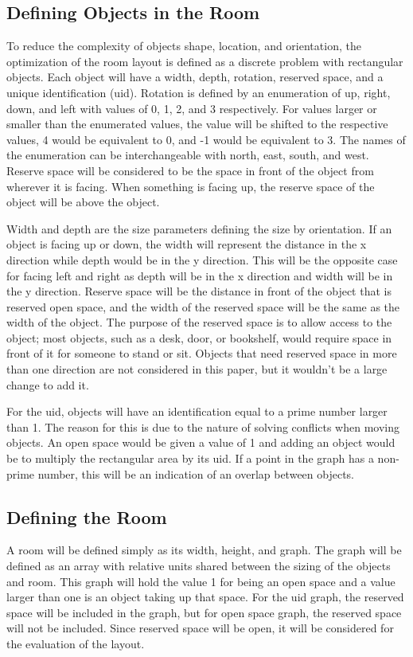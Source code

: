 \documentclass[conference]{IEEEtran}
\begin{document}
    \subsection{Defining Objects in the Room}
    To reduce the complexity of objects shape, location, and orientation, the optimization of the room layout is defined as a discrete problem with rectangular objects. Each object will have a width, depth, rotation, reserved space, and a unique identification (uid). Rotation is defined by an enumeration of up, right, down, and left with values of 0, 1, 2, and 3 respectively. For values larger or smaller than the enumerated values, the value will be shifted to the respective values, 4 would be equivalent to 0, and -1 would be equivalent to 3. The names of the enumeration can be interchangeable with north, east, south, and west. Reserve space will be considered to be the space in front of the object from wherever it is facing. When something is facing up, the reserve space of the object will be above the object.
    
    Width and depth are the size parameters defining the size by orientation. If an object is facing up or down, the width will represent the distance in the x direction while depth would be in the y direction. This will be the opposite case for facing left and right as depth will be in the x direction and width will be in the y direction. Reserve space will be the distance in front of the object that is reserved open space, and the width of the reserved space will be the same as the width of the object. The purpose of the reserved space is to allow access to the object; most objects, such as a desk, door, or bookshelf, would require space in front of it for someone to stand or sit. Objects that need reserved space in more than one direction are not considered in this paper, but it wouldn’t be a large change to add it.
    
    For the uid, objects will have an identification equal to a prime number larger than 1. The reason for this is due to the nature of solving conflicts when moving objects. An open space would be given a value of 1 and adding an object would be to multiply the rectangular area by its uid. If a point in the graph has a non-prime number, this will be an indication of an overlap between objects.
    

    \subsection{Defining the Room}
    A room will be defined simply as its width, height, and graph. The graph will be defined as an array with relative units shared between the sizing of the objects and room. This graph will hold the value 1 for being an open space and a value larger than one is an object taking up that space. For the uid graph, the reserved space will be included in the graph, but for open space graph, the reserved space will not be included. Since reserved space will be open, it will be considered for the evaluation of the layout.
\end{document}
